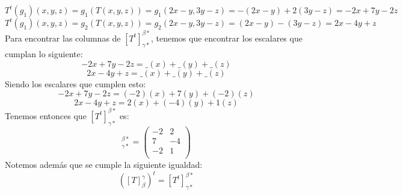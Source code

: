\begin{enumerate}
    \begin{equation*}
        T^t(g_1)(x,y,z)=g_1(T(x,y,z))=g_1(2x-y, 3y-z)=-(2x-y)+2(3y-z)=-2x+7y-2z
    \end{equation*}
    \begin{equation*}
        T^t(g_1)(x,y,z)=g_2(T(x,y,z))=g_2(2x-y, 3y-z)=(2x-y)-(3y-z)=2x-4y+z
    \end{equation*}
    Para encontrar las columnas de $[T^t]^{\beta*}_{\gamma*}$, tenemos que encontrar los escalares que cumplan lo siguiente:
    \begin{equation*}
        -2x+7y-2z=\_(x)+\_(y)+\_(z)
    \end{equation*}
    \begin{equation*}
        2x-4y+z=\_(x)+\_(y)+\_(z)
    \end{equation*}
    Siendo los escalares que cumplen esto:
    \begin{equation*}
        -2x+7y-2z=(-2)(x)+7(y)+(-2)(z)
    \end{equation*}
    \begin{equation*}
        2x-4y+z=2(x)+(-4)(y)+1(z)
    \end{equation*}
    Tenemos entonces que $[T^t]^{\beta*}_{\gamma*}$ es:
    \begin{equation*}
        [T^t]^{\beta*}_{\gamma*}=\begin{pmatrix}
               -2 & 2\\
           7 & -4 \\
           -2 & 1 \\
        \end{pmatrix}
    \end{equation*}
    Notemos además que se cumple la siguiente igualdad:
    \begin{equation*}
        ([T]_{\beta}^{\gamma})^t= [T^t]^{\beta*}_{\gamma*}
    \end{equation*}

\end{enumerate}